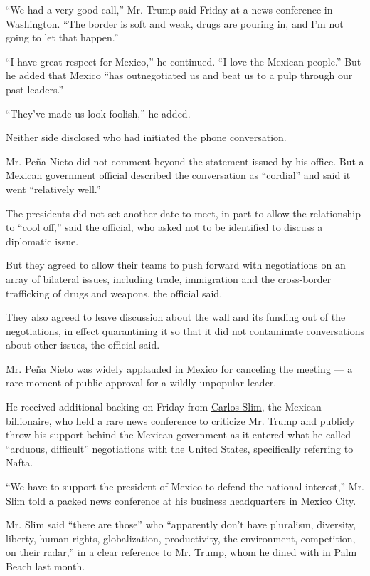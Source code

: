 ``We had a very good call,'' Mr. Trump said Friday at a news conference
in Washington. ``The border is soft and weak, drugs are pouring in, and
I'm not going to let that happen.''

``I have great respect for Mexico,'' he continued. ``I love the Mexican
people.'' But he added that Mexico ``has outnegotiated us and beat us to
a pulp through our past leaders.''

``They've made us look foolish,'' he added.

Neither side disclosed who had initiated the phone conversation.

Mr. Peña Nieto did not comment beyond the statement issued by his
office. But a Mexican government official described the conversation as
``cordial'' and said it went ``relatively well.''

The presidents did not set another date to meet, in part to allow the
relationship to ``cool off,'' said the official, who asked not to be
identified to discuss a diplomatic issue.

But they agreed to allow their teams to push forward with negotiations
on an array of bilateral issues, including trade, immigration and the
cross-border trafficking of drugs and weapons, the official said.

They also agreed to leave discussion about the wall and its funding out
of the negotiations, in effect quarantining it so that it did not
contaminate conversations about other issues, the official said.

Mr. Peña Nieto was widely applauded in Mexico for canceling the meeting
--- a rare moment of public approval for a wildly unpopular leader.

He received additional backing on Friday from
\href{https://www.nytimes.com/topic/person/carlos-slim-helu?8qa}{Carlos
Slim}, the Mexican billionaire, who held a rare news conference to
criticize Mr. Trump and publicly throw his support behind the Mexican
government as it entered what he called ``arduous, difficult''
negotiations with the United States, specifically referring to Nafta.

``We have to support the president of Mexico to defend the national
interest,'' Mr. Slim told a packed news conference at his business
headquarters in Mexico City.

Mr. Slim said ``there are those'' who ``apparently don't have pluralism,
diversity, liberty, human rights, globalization, productivity, the
environment, competition, on their radar,'' in a clear reference to Mr.
Trump, whom he dined with in Palm Beach last month.

